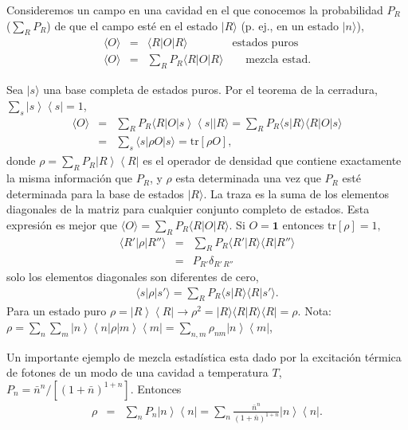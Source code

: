 \documentclass[twocolumn,aps,eqsecnum]{revtex4}
\providecommand{\vxp}[1]{\langle #1 \rangle}
\providecommand{\bra}[1]{\langle #1 \rvert}
\providecommand{\ket}[1]{\lvert #1 \rangle}
\providecommand{\braket}[2]{\langle #1 \rvert #2 \rangle}
\providecommand{\tr}[1]{\text{tr}\left[ #1 \right]}
\newcommand{\ketbra}[2]{\left| {#1} \right\rangle\left\langle {#2}\right|}
\begin{document}
Consideremos un campo en una cavidad en el que conocemos la probabilidad 
$P_R$ ($\sum_R P_R$) de que el campo est\'e en el estado $\ket{R}$ (p. ej., 
en un estado $\ket{n}$),   
%
\begin{eqnarray*}
\vxp{O} &=& \bra{R} O \ket{R}  \qquad \qquad \text{estados puros} \\ 
\vxp{O} &=& \sum_R P_R \bra{R} O \ket{R} \qquad \text{mezcla estad.} 
\end{eqnarray*}

Sea $\ket{s}$ una base completa de estados puros. Por el teorema de la 
cerradura, $\sum_s \ketbra{s}{s} =1$, 
%
\begin{eqnarray*}
\vxp{O} &=& \sum_R P_R \bra{R} O \ketbra{s}{s} \ket{R}  
    = \sum_R P_R \braket{s}{R} \bra{R} O \ket{s}  \\  
    &=& \sum_s  \bra{s} \rho O \ket{s} = \tr{\rho O} , 
\end{eqnarray*}
donde $\rho = \sum_R P_R \ketbra{R}{R}$ es el operador de densidad 
que contiene exactamente la misma informaci\'on que $P_R$, y $\rho$ 
esta determinada una vez que $P_R$ est\'e determinada para la base de 
estados $\ket{R}$. La traza es la suma de los elementos diagonales de 
la matriz para cualquier conjunto completo de estados. Esta 
expresi\'on es mejor que $\vxp{O} = \sum_R P_R \bra{R} O \ket{R}$. 
Si $O= \mathbf{1}$ entonces $\tr{\rho} =1, $
%
\begin{eqnarray*}
\bra{R'} \rho \ket{R''} 
    &=& \sum_R P_R \braket{R'}{R} \braket{R}{R''}     \\ 
    &=& P_{R'} \delta_{R' \,R''} 
\end{eqnarray*}
solo los elementos diagonales son diferentes de cero, 
%
\begin{eqnarray*}
\bra{s} \rho \ket{s'} = \sum_R P_R \braket{s}{R} \braket{R}{s'} . 
\end{eqnarray*}
Para un estado puro $\rho = \ketbra{R}{R} \to \rho^2 
= \ket{R} \braket{R}{R} \bra{R}  = \rho$. Nota: 
$\rho = \sum_n \sum_m \ketbra{n}{n} \rho \ketbra{m}{m} 
    = \sum_{n,m} \rho_{nm} \ketbra{n}{m}$, 

Un importante ejemplo de mezcla estad\'istica esta dado por la 
excitaci\'on t\'ermica de fotones de un modo de una cavidad a temperatura 
$T$, $P_n = \bar{n}^n /[(1+\bar{n})^{1+n}]$. Entonces 
%
\begin{eqnarray*}
\rho &=& \sum_n P_n \ketbra{n}{n} 
    = \sum_n \frac{\bar{n}^n}{(1+\bar{n})^{1+n}} \ketbra{n}{n} .
\end{eqnarray*}
\end{document}
